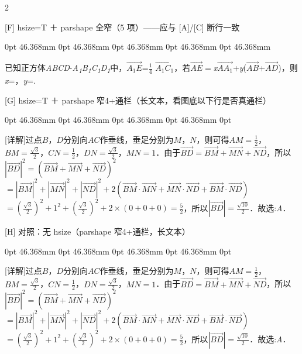 \documentclass[fontset=none]{ctexart}
\begin{document}
\begin{multicols}{2}
\def\QPTEXT{已知正方体\emph{ABCD}-\emph{A\textsubscript{1}B\textsubscript{1}C\textsubscript{1}D\textsubscript{1}}中，\(\overrightarrow{A_{1}E}\)=\(\frac{1}{4}\) \(\overrightarrow{A_{1}C_{1}}\)，若\(\overrightarrow{AE} =\)\emph{x}\(\overrightarrow{AA_{1}}\)+\emph{y}(\(\overrightarrow{AB}\)+\(\overrightarrow{AD}\))，则\emph{x}\nobreak=\kongbai{}，\emph{y}\nobreak=\kongbai{}.}
\def\QPLONG{[详解]过点\(B\)，\(D\)分别向\(AC\)作垂线，垂足分别为\(M\)，\(N\)，则可得\(AM = \frac{1}{2}\)，\(BM = \frac{\sqrt{3}}{2}\)，\(CN = \frac{1}{2}\)，\(DN = \frac{\sqrt{3}}{2}\)，\(MN = 1\)．由于\(\overrightarrow{BD} = \overrightarrow{BM} + \overrightarrow{MN} + \overrightarrow{ND}\)，所以\(|\overrightarrow{BD}|^{2} = {(\overrightarrow{BM} + \overrightarrow{MN} + \overrightarrow{ND})}^{2}\)\allowbreak\(= |\overrightarrow{BM}|^{2} + |\overrightarrow{MN}|^{2} + |\overrightarrow{ND}|^{2} + 2(\overrightarrow{BM} \cdot \overrightarrow{MN} + \overrightarrow{MN} \cdot \overrightarrow{ND} + \overrightarrow{BM} \cdot \overrightarrow{ND})\)\allowbreak\(= ( \frac{\sqrt{3}}{2} )^{2} + 1^{2} + ( \frac{\sqrt{3}}{2} )^{2} + 2 \times (0 + 0 + 0) = \frac{5}{2}\)，所以\(|\overrightarrow{BD}| = \frac{\sqrt{10}}{2}\)．故选:\emph{A}．}

[F] hsize=T ＋ parshape 全窄（5 项）——应与 [A]/[C] 断行一致\par
\noindent\begingroup\hsize=46.368mm 0pt 46.368mm 0pt 46.368mm 0pt 46.368mm 0pt 46.368mm 0pt 46.368mm\raggedright
\QPTEXT\par\endgroup
\vspace{3mm}

[G] hsize=T ＋ parshape 窄4+通栏（长文本，看图底以下行是否真通栏）\par
\noindent\begingroup\hsize=46.368mm 0pt 46.368mm 0pt 46.368mm 0pt 46.368mm 0pt 46.368mm 0pt \linewidth\raggedright
\QPLONG\par\endgroup
\vspace{3mm}

[H] 对照：无 hsize（parshape 窄4+通栏，长文本）\par
\noindent\begingroup{} 0pt 46.368mm 0pt 46.368mm 0pt 46.368mm 0pt 46.368mm 0pt \linewidth\raggedright
\QPLONG\par\endgroup
\end{multicols}
\end{document}
